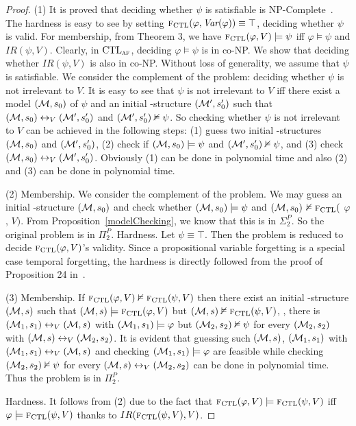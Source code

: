 \documentclass{article}
\begin{document}
\begin{proof}
(1) It is proved that deciding whether $\psi$ is satisfiable is NP-Complete~\cite{DBLP:journals/ijfcs/MeierTVM15}. The hardness is easy to see by setting ${\textsc{f}_{\textrm{CTL}}}(\varphi, \textit{Var}(\varphi))\equiv \top$, \ie deciding whether $\psi$ is valid.
For membership, from Theorem
3, we have ${\textsc{f}_{\textrm{CTL}}}(\varphi, V ) \models \psi$ iff $\varphi \models \psi$ and $IR(\psi, V )$.
Clearly, in $\textrm{CTL}_{\textsc{a} \textsc{f}}$, deciding $\varphi\models \psi$ is in co-NP. We show that deciding whether $IR(\psi, V )$ is also
in co-NP. Without loss of generality, we assume that $\psi$ is satisfiable.
 We consider the complement of the problem: deciding whether $\psi$ is not irrelevant to $V$. It is easy to see that $\psi$ is
not irrelevant to $V$ iff there exist a model $({\cal M}, s_0)$ of $\psi$ and an
initial \MPK-structure $({\cal M}',s_0')$  such that
$({\cal M}, s_0) \leftrightarrow_V ({\cal M}',s_0')$ and $({\cal M}',s_0')\nvDash \psi$. So checking whether $\psi$ is not irrelevant to $V$ can be achieved in the following steps: (1) guess two initial \MPK-structures $({\cal M},s_0)$ and $({\cal M}',s_0')$, (2) check if $({\cal M},s_0) \models \psi$ and $({\cal M}',s_0')\nvDash \psi$, and (3) check
$({\cal M}, s_0) \leftrightarrow_V ({\cal M}',s_0')$. Obviously (1) can be done in polynomial time and also (2) and (3) can be done in polynomial time.

(2) Membership. We consider the complement of the
problem. We may guess an initial \MPK-structure $({\cal M}, s_0)$ and check whether $({\cal M},s_0) \models \psi$ and $({\cal M},s_0)$ $\nvDash {\textsc{f}_{\textrm{CTL}}}($ $\varphi$, $V)$. From Proposition~\ref{modelChecking}, we know that this is in $\Sigma_2^P$. So the original problem is in $\Pi_2^P$. Hardness. Let $\psi \equiv \top$. Then the problem is reduced to decide ${\textsc{f}_{\textrm{CTL}}}(\varphi, V )$'s validity. Since a propositional variable forgetting is a special case temporal forgetting, the hardness is directly followed from the proof of Proposition 24 in~\cite{DBLP:journals/jair/LangLM03}.

(3) Membership. If ${\textsc{f}_{\textrm{CTL}}}(\varphi, V) \nvDash {\textsc{f}_{\textrm{CTL}}}(\psi, V)$ then there exist an initial \MPK-structure $({\cal M}, s)$ such that $({\cal M}, s)\models {\textsc{f}_{\textrm{CTL}}}(\varphi, V)$ but $({\cal M}, s) \nvDash {\textsc{f}_{\textrm{CTL}}}(\psi, V)$, \ie, there is $({\cal M}_1, s_1) \leftrightarrow_V ({\cal M}, s)$ with $({\cal M}_1, s_1) \models \varphi$ but $({\cal M}_2, s_2) \nvDash \psi$ for every $({\cal M}_2, s_2)$ with $({\cal M}, s) \leftrightarrow_V ({\cal M}_2, s_2)$. It is evident that guessing such $({\cal M}, s)$, $({\cal M}_1, s_1)$ with $({\cal M}_1, s_1) \leftrightarrow_V ({\cal M}, s)$ and checking $({\cal M}_1, s_1)\models \varphi$ are feasible while checking $({\cal M}_2, s_2) \nvDash \psi$ for every $({\cal M}, s) \leftrightarrow_V ({\cal M}_2, s_2)$ can be done in polynomial time. Thus the problem is in $\Pi_2^P$.

Hardness. It follows from (2) due to the fact that ${\textsc{f}_{\textrm{CTL}}}(\varphi, V) \models {\textsc{f}_{\textrm{CTL}}}(\psi, V)$ iff $\varphi \models {\textsc{f}_{\textrm{CTL}}}(\psi, V)$ thanks to $IR({\textsc{f}_{\textrm{CTL}}}(\psi, V), V)$.

\end{proof}
\end{document}
